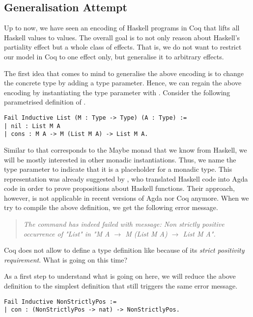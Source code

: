 \subsection{Generalisation Attempt}
\label{subsec:genericLifting}

Up to now, we have seen an encoding of Haskell programs in Coq that lifts all Haskell values to  values.
The overall goal is to not only reason about Haskell's partiality effect but a whole class of effects.
That is, we do not want to restrict our model in Coq to one effect only, but generalise it to arbitrary effects.

The first idea that comes to mind to generalise the above encoding is to change the concrete type  by adding a type parameter.
Hence, we can regain the above encoding by instantiating the type parameter with .
Consider the following parametrised definition of .

\begin{verbatim}
Fail Inductive List (M : Type -> Type) (A : Type) :=
| nil : List M A
| cons : M A -> M (List M A) -> List M A.
\end{verbatim}

Similar to  that corresponds to the Maybe monad that we know from Haskell, we will be mostly interested in other monadic instantiations.
Thus, we name the type parameter  to indicate that it is a placeholder for a monadic type.
This representation was already suggested by \citet{abel2005verifying}, who translated Haskell code into Agda~\citep{norell2008dependently} code in order to prove propositions about Haskell functions.
Their approach, however, is not applicable in recent versions of Agda nor Coq anymore.
When we try to compile the above definition, we get the following error message.

\begin{quote}
\emph{The command has indeed failed with message:
Non strictly positive occurrence of "List" in "M A $\rightarrow$ M (List M A) $\rightarrow$ List M A".}
\end{quote}

Coq does not allow to define a type definition like  because of its \emph{strict positivity requirement}.
What is going on this time?

As a first step to understand what is going on here, we will reduce the above definition to the simplest definition that still triggers the same error message.

\begin{verbatim}
Fail Inductive NonStrictlyPos :=
| con : (NonStrictlyPos -> nat) -> NonStrictlyPos.
\end{verbatim}

